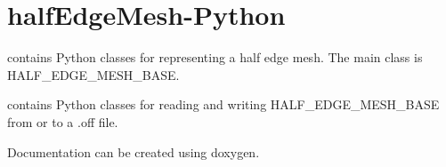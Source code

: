 \chapter{half\+Edge\+Mesh-\/\+Python}
\hypertarget{md_README}{}\label{md_README}
\label{md_README_autotoc_md0}%
%
  contains Python classes for representing a half edge mesh. The main class is HALF\+\_\+\+EDGE\+\_\+\+MESH\+\_\+\+BASE.

 contains Python classes for reading and writing HALF\+\_\+\+EDGE\+\_\+\+MESH\+\_\+\+BASE from or to a .off file.

Documentation can be created using doxygen. 